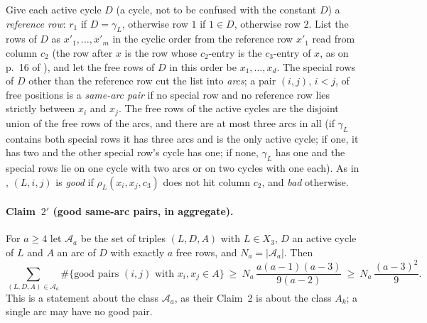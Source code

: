 \documentclass[11pt]{article}
\theoremstyle{definition}
\begin{document}
Give each active cycle $D$ (a cycle, not to be confused with the constant $D$) a \emph{reference row}: $r_1$ if $D=\gamma_L$, otherwise row $1$
if $1\in D$, otherwise row $2$.  List the rows of $D$ as $x'_1,\dots,x'_m$ in the cyclic
order from the reference row $x'_1$ read from column $c_2$ (the row after $x$ is the row
whose $c_2$-entry is the $c_3$-entry of $x$, as on p.~16 of \cite{AM26}), and let the free
rows of $D$ in this order be $x_1,\dots,x_d$.  The special rows of $D$ other than the
reference row cut the list into \emph{arcs}; a pair $(i,j)$, $i<j$, of free positions is a
\emph{same-arc pair} if no special row and no reference row lies strictly between $x_i$
and $x_j$.  The free rows of the active cycles are the disjoint union of the free rows of
the arcs, and there are at most three arcs in all (if $\gamma_L$ contains both special rows
it has three arcs and is the only active cycle; if one, it has two and the other special
row's cycle has one; if none, $\gamma_L$ has one and the special rows lie on one cycle with
two arcs or on two cycles with one each).  As in \cite{AM26}, $(L,i,j)$ is \emph{good} if
$\rho_L(x_i,x_j,c_3)$ does not hit column $c_2$, and \emph{bad} otherwise.

\paragraph{Claim~$2'$ (good same-arc pairs, in aggregate).}  For $a\ge4$ let $\mathcal A_a$
be the set of triples $(L,D,A)$ with $L\in X_3$, $D$ an active cycle of $L$ and $A$ an arc
of $D$ with exactly $a$ free rows, and $N_a=|\mathcal A_a|$.  Then
\[
\sum_{(L,D,A)\in\mathcal A_a}\#\{\text{good pairs }(i,j)\text{ with }x_i,x_j\in A\}
\ \ge\ N_a\,\frac{a(a-1)(a-3)}{9(a-2)}\ \ge\ N_a\,\frac{(a-3)^2}{9}.
\]
This is a statement about the class $\mathcal A_a$, as their Claim~2 is about the class
$A_k$; a single arc may have no good pair.
\end{document}
